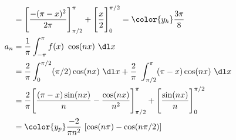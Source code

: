 \begin{enumerate}
\begin{align}
                  & =  \Bigg[ \frac{-(\pi-x)^2}{2\pi} \Bigg]_{\pi/2}^{\pi}
              + \Bigg[ \frac{x}{2} \Bigg]_{0}^{\pi/2}
              = \color{y_h} \frac{3\pi}{8}                                        \\
              a_n & = \frac{1}{\pi} \int_{-\pi}^{\pi} f(x)\ \cos(nx)\ \dl x       \\
                  & = \frac{2}{\pi} \int_{0}^{\pi/2} (\pi/2) \cos(nx)\ \dl x
              + \frac{2}{\pi}\ \int_{\pi/2}^{\pi} (\pi-x) \cos(nx)\ \dl x         \\
                  & = \frac{2}{\pi}\Bigg[ \frac{(\pi - x) \sin(nx)}{n}
                  - \frac{\cos(nx)}{n^2}\Bigg]_{\pi/2}^{\pi} +
              \Bigg[ \frac{\sin(nx)}{n} \Bigg]_{0}^{\pi/2}                        \\
                  & = \color{y_p} \frac{-2}{\pi n^2}\ [\cos(n\pi) - \cos(n\pi/2)]
          \end{align}


\end{enumerate}
